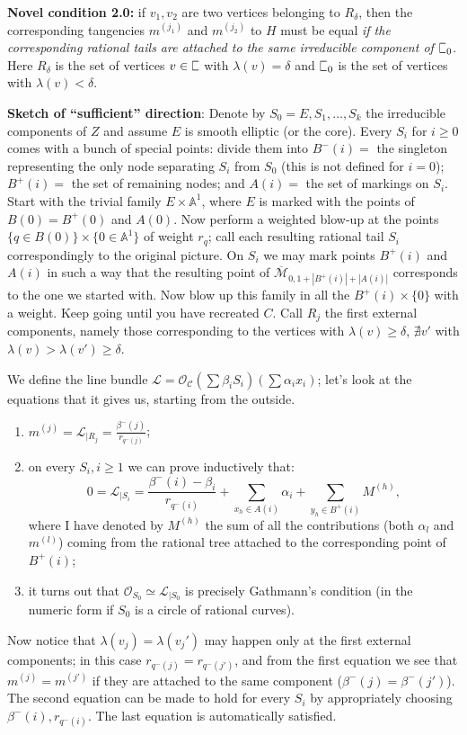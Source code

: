 \documentclass[11pt]{amsart}
\newcommand{\plC}{\scalebox{0.8}[1.3]{$\sqsubset$}}
\newcommand{\oM}{\overline{\mathcal{M}}}
\newcommand{\OO}{\mathcal{O}}
\newcommand{\cC}{\mathcal C}
\newcommand{\Aaff}{\mathbb{A}}
\theoremstyle{definition}
\theoremstyle{definition}
\begin{document}
\textbf{Novel condition 2.0:} if $v_1,v_2$ are two vertices belonging to $R_\delta$, then the corresponding tangencies $m^{(j_1)}$ and $m^{(j_2)}$ to $H$ must be equal \emph{if the corresponding rational tails are attached to the same irreducible component of $\plC_0$}. Here $R_\delta$ is the set of vertices $v \in \plC$ with $\lambda(v)=\delta$ and $\plC_0$ is the set of vertices with $\lambda(v)<\delta$.

\textbf{Sketch of ``sufficient'' direction}: Denote by $S_0=E,S_1,\ldots,S_k$ the irreducible components of $Z$ and assume $E$ is smooth elliptic (or the core). Every $S_i$ for $i\geq 0$ comes with a bunch of special points: divide them into $B^-(i)=$ the singleton representing the only node separating $S_i$ from $S_0$ (this is not defined for $i=0$); $B^+(i)=$ the set of remaining nodes; and $A(i)=$ the set of markings on $S_i$. Start with the trivial family $E\times\Aaff^1$, where $E$ is marked with the points of $B(0)=B^+(0)$ and $A(0)$. Now perform a weighted blow-up at the points $\{q\in B(0)\}\times\{0\in\Aaff^1\}$ of weight $r_q$; call each resulting rational tail $S_i$ correspondingly to the original picture. On $S_i$ we may mark points $B^+(i)$ and $A(i)$ in such a way that the resulting point of $\oM_{0,1+|B^+(i)|+|A(i)|}$ corresponds to the one we started with. Now blow up this family in all the $B^+(i)\times\{0\}$ with a weight. Keep going until you have recreated $C$. Call $R_j$ the first external components, namely those corresponding to the vertices with $\lambda(v)\geq\delta$, $\nexists v'$ with $\lambda(v)>\lambda(v')\geq\delta$.

We define the line bundle $\mathcal L=\OO_{\cC}(\sum \beta_iS_i)(\sum \alpha_ix_i)$; let's look at the equations that it gives us, starting from the outside.
\begin{enumerate}
 \item $m^{(j)}=\mathcal L_{|R_j}=\frac{\beta^-(j)}{r_{q^-(j)}}$;
 \item on every $S_i, i\geq1$ we can prove inductively that:
 \[0=\mathcal L_{|S_i}=\frac{\beta^-(i)-\beta_i}{r_{q^-(i)}}+\sum_{x_h\in A(i)}\alpha_i+\sum_{y_h\in B^+(i)}M^{(h)},\]
 where I have denoted by $M^{(h)}$ the sum of all the contributions (both $\alpha_l$ and $m^{(l)}$) coming from the rational tree attached to the corresponding point of $B^+(i)$;
 \item it turns out that $\OO_{S_0}\simeq\mathcal L_{|S_0}$ is precisely Gathmann's condition (in the numeric form if $S_0$ is a circle of rational curves). 
\end{enumerate}
Now notice that $\lambda(v_j)=\lambda(v_j')$ may happen only at the first external components;  in this case $r_{q^-(j)}=r_{q^-(j')}$, and from the first equation we see that $m^{(j)}=m^{(j')}$ if they are attached to the same component ($\beta^-(j)=\beta^-(j')$).
The second equation can be made to hold for every $S_i$ by appropriately choosing $\beta^-(i), r_{q^-(i)}$. The last equation is automatically satisfied.
\end{document}
